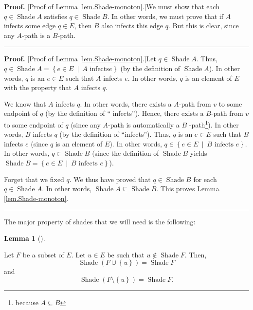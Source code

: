 \documentclass[numbers=enddot,12pt,final,onecolumn]{scrartcl}%
\theoremstyle{definition}
\newtheorem{lem}[theo]{Lemma}
\newenvironment{lemma}[1][]
{\begin{lem}[#1]\begin{leftbar}}
{\end{leftbar}\end{lem}}
\newenvironment{proof}[1][Proof]{\noindent\textbf{#1.} }{\ \rule{0.5em}{0.5em}}
\newenvironment{verlong}{}{}
\newenvironment{vershort}{}{}
\begin{document}
\begin{vershort}
\begin{proof}
[Proof of Lemma \ref{lem.Shade-monoton}.]We must show that each $q\in
\operatorname*{Shade}A$ satisfies $q\in\operatorname*{Shade}B$. In other
words, we must prove that if $A$ infects some edge $q\in E$, then $B$ also
infects this edge $q$. But this is clear, since any $A$-path is a $B$-path.
\end{proof}
\end{vershort}

\begin{verlong}
\begin{proof}
[Proof of Lemma \ref{lem.Shade-monoton}.]Let $q\in\operatorname*{Shade}A$.
Thus, $q\in\operatorname*{Shade}A=\left\{  e\in E\ \mid\ A\text{ infects
}e\right\}  $ (by the definition of $\operatorname*{Shade}A$). In other words,
$q$ is an $e\in E$ such that $A$ infects $e$. In other words, $q$ is an
element of $E$ with the property that $A$ infects $q$.

We know that $A$ infects $q$. In other words, there exists a $A$-path from $v$
to some endpoint of $q$ (by the definition of \textquotedblleft
infects\textquotedblright). Hence, there exists a $B$-path from $v$ to some
endpoint of $q$ (since any $A$-path is automatically a $B$%
-path\footnote{because $A\subseteq B$}). In other words, $B$ infects $q$ (by
the definition of \textquotedblleft infects\textquotedblright). Thus, $q$ is
an $e\in E$ such that $B$ infects $e$ (since $q$ is an element of $E$). In
other words, $q\in\left\{  e\in E\ \mid\ B\text{ infects }e\right\}  $. In
other words, $q\in\operatorname*{Shade}B$ (since the definition of
$\operatorname*{Shade}B$ yields $\operatorname*{Shade}B=\left\{  e\in
E\ \mid\ B\text{ infects }e\right\}  $).

Forget that we fixed $q$. We thus have proved that $q\in\operatorname*{Shade}%
B$ for each $q\in\operatorname*{Shade}A$. In other words,
$\operatorname*{Shade}A\subseteq\operatorname*{Shade}B$. This proves Lemma
\ref{lem.Shade-monoton}.
\end{proof}
\end{verlong}

The major property of shades that we will need is the following:

\begin{lemma}
\label{lem.Shade-tog}Let $F$ be a subset of $E$. Let $u\in E$ be such that
$u\notin\operatorname*{Shade}F$. Then,%
\begin{equation}
\operatorname*{Shade}\left(  F\cup\left\{  u\right\}  \right)
=\operatorname*{Shade}F \label{eq.lem.Shade-tog.union}%
\end{equation}
and%
\begin{equation}
\operatorname*{Shade}\left(  F\setminus\left\{  u\right\}  \right)
=\operatorname*{Shade}F. \label{eq.lem.Shade-tog.diff}%
\end{equation}

\end{lemma}
\end{document}

